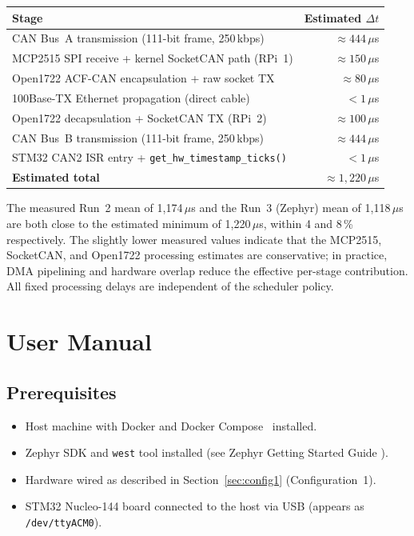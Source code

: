 \documentclass[11pt,a4paper]{article}
\begin{document}
\begin{center}
\begin{tabular}{lr}
    \toprule
    \textbf{Stage} & \textbf{Estimated $\Delta t$} \\
    \midrule
    CAN Bus~A transmission (111-bit frame, 250\,kbps) & $\approx 444\,\mu$s \\
    MCP2515 SPI receive + kernel SocketCAN path (RPi~1) & $\approx 150\,\mu$s \\
    Open1722 ACF-CAN encapsulation + raw socket TX & $\approx 80\,\mu$s \\
    100Base-TX Ethernet propagation (direct cable) & $< 1\,\mu$s \\
    Open1722 decapsulation + SocketCAN TX (RPi~2) & $\approx 100\,\mu$s \\
    CAN Bus~B transmission (111-bit frame, 250\,kbps) & $\approx 444\,\mu$s \\
    STM32 CAN2 ISR entry + \texttt{get\_hw\_timestamp\_ticks()} & $< 1\,\mu$s \\
    \midrule
    \textbf{Estimated total} & $\approx 1{,}220\,\mu$s \\
    \bottomrule
\end{tabular}
\end{center}

The measured Run~2 mean of 1{,}174\,$\mu$s and the Run~3 (Zephyr) mean of 1{,}118\,$\mu$s
are both close to the estimated minimum of 1{,}220\,$\mu$s, within 4 and 8\,\%
respectively.  The slightly lower measured values indicate that the MCP2515, SocketCAN,
and Open1722 processing estimates are conservative; in practice, DMA pipelining and
hardware overlap reduce the effective per-stage contribution.  All fixed processing
delays are independent of the scheduler policy.

\section{User Manual}
\label{sec:manual}

\subsection{Prerequisites}

\begin{itemize}
    \item Host machine with Docker and Docker Compose~\cite{docker} installed.
    \item Zephyr SDK and \texttt{west} tool installed (see Zephyr Getting Started
          Guide \cite{zephyr}).
    \item Hardware wired as described in Section~\ref{sec:config1} (Configuration~1).
    \item STM32 Nucleo-144 board connected to the host via USB (appears as
          \texttt{/dev/ttyACM0}).
\end{itemize}
\end{document}
